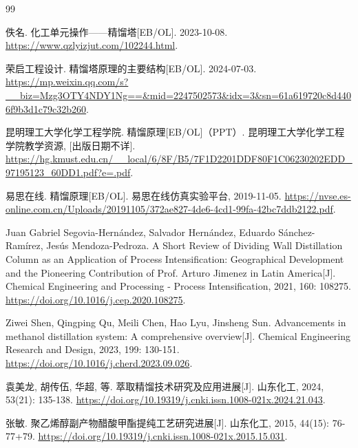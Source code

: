 \documentclass[a4paper,zihao=-4]{article}
\numberwithin{equation}{section}
\numberwithin{figure}{section}
\numberwithin{table}{section}
\begin{document}
\newpage
\begin{thebibliography}{99}
	
	 佚名. 化工单元操作——精馏塔[EB/OL]. 2023-10-08. \url{https://www.qzlyizjut.com/102244.html}.
	
	 荣启工程设计. 精馏塔原理的主要结构[EB/OL]. 2024-07-03. \url{https://mp.weixin.qq.com/s?__biz=Mzg3OTY4NDY1Ng==&mid=2247502573&idx=3&sn=61a619720c8d4406f9b3d1c79c32b260}.
	
	 昆明理工大学化学工程学院. 精馏原理[EB/OL]（PPT）. 昆明理工大学化学工程学院教学资源, [出版日期不详]. \url{https://hg.kmust.edu.cn/__local/6/8F/B5/7F1D2201DDF80F1C06230202EDD_97195123_60DD1.pdf?e=.pdf}.
	
	 易思在线. 精馏原理[EB/OL]. 易思在线仿真实验平台, 2019-11-05. \url{https://nvse.es-online.com.cn/Uploads/20191105/372ae827-4de6-4cd1-99fa-42bc7ddb2122.pdf}.
	
	 Juan Gabriel Segovia-Hernández, Salvador Hernández, Eduardo Sánchez-Ramírez, Jesús Mendoza-Pedroza. A Short Review of Dividing Wall Distillation Column as an Application of Process Intensification: Geographical Development and the Pioneering Contribution of Prof. Arturo Jimenez in Latin America[J]. Chemical Engineering and Processing - Process Intensification, 2021, 160: 108275. \url{https://doi.org/10.1016/j.cep.2020.108275}.
	
	 Ziwei Shen, Qingping Qu, Meili Chen, Hao Lyu, Jinsheng Sun. Advancements in methanol distillation system: A comprehensive overview[J]. Chemical Engineering Research and Design, 2023, 199: 130-151. \url{https://doi.org/10.1016/j.cherd.2023.09.026}.
	
	 袁美龙, 胡传伍, 华超, 等. 萃取精馏技术研究及应用进展[J]. 山东化工, 2024, 53(21): 135-138. \url{https://doi.org/10.19319/j.cnki.issn.1008-021x.2024.21.043}.
	
	 张敏. 聚乙烯醇副产物醋酸甲酯提纯工艺研究进展[J]. 山东化工, 2015, 44(15): 76-77+79. \url{https://doi.org/10.19319/j.cnki.issn.1008-021x.2015.15.031}.
	
\end{thebibliography}
\end{document}
